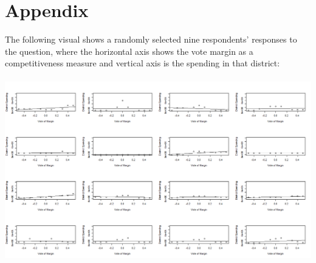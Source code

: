 \documentclass{article}
\begin{document}



\section{Appendix} 
The following visual shows a randomly selected nine respondents' responses to the question, where the horizontal axis shows the vote margin as a competitiveness measure and vertical axis is the spending in that district:\\
\\
\includegraphics[width=180mm]{Respondents_1}
\\

\end{document}
